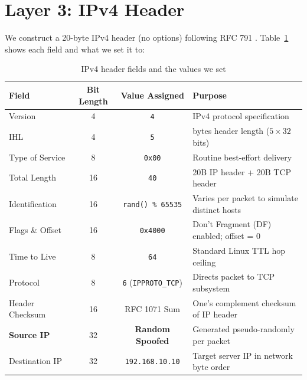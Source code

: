 \documentclass[11pt,a4paper]{report}
\begin{document}
\section{Layer 3: IPv4 Header}
We construct a 20-byte IPv4 header (no options) following RFC 791 \cite{rfc791}. Table~\ref{tab:ipv4_fields} shows each field and what we set it to:
\begin{table}[H]
    \centering
    \small
    \renewcommand{\arraystretch}{0.88}
    \caption{IPv4 header fields and the values we set}
    \label{tab:ipv4_fields}
    \begin{tabularx}{\textwidth}{@{}l c c >{\raggedright\arraybackslash}X@{}}
        \toprule
        \textbf{Field} & \textbf{Bit Length} & \textbf{Value Assigned} & \textbf{Purpose} \\
        \midrule
        Version & 4 & \texttt{4} & IPv4 protocol specification \\
        IHL & 4 & \texttt{5} & 20 bytes header length ($5 \times 32$ bits) \\
        Type of Service & 8 & \texttt{0x00} & Routine best-effort delivery \\
        Total Length & 16 & \texttt{40} & 20B IP header + 20B TCP header \\
        Identification & 16 & \texttt{rand() \% 65535} & Varies per packet to simulate distinct hosts \\
        Flags \& Offset & 16 & \texttt{0x4000} & Don't Fragment (DF) enabled; offset = 0 \\
        Time to Live & 8 & \texttt{64} & Standard Linux TTL hop ceiling \\
        Protocol & 8 & \texttt{6} (\texttt{IPPROTO\_TCP}) & Directs packet to TCP subsystem \\
        Header Checksum & 16 & RFC 1071 Sum & One's complement checksum of IP header \\
        \textbf{Source IP} & 32 & \textbf{Random Spoofed} & Generated pseudo-randomly per packet \\
        Destination IP & 32 & \texttt{192.168.10.10} & Target server IP in network byte order \\
        \bottomrule
    \end{tabularx}
\end{table}
\end{document}
